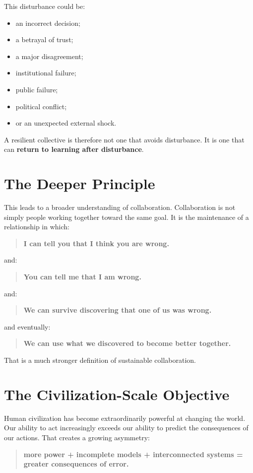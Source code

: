 \documentclass{article}
\begin{document}
This disturbance could be:
\begin{itemize}
    \item an incorrect decision;
    \item a betrayal of trust;
    \item a major disagreement;
    \item institutional failure;
    \item public failure;
    \item political conflict;
    \item or an unexpected external shock.
\end{itemize}

A resilient collective is therefore not one that avoids disturbance. It is one that can \textbf{return to learning after disturbance}.

\section{The Deeper Principle}
This leads to a broader understanding of collaboration. Collaboration is not simply people working together toward the same goal. It is the maintenance of a relationship in which:
\begin{quote}
    \textbf{I can tell you that I think you are wrong.}
\end{quote}
and:
\begin{quote}
    \textbf{You can tell me that I am wrong.}
\end{quote}
and:
\begin{quote}
    \textbf{We can survive discovering that one of us was wrong.}
\end{quote}
and eventually:
\begin{quote}
    \textbf{We can use what we discovered to become better together.}
\end{quote}

That is a much stronger definition of sustainable collaboration.

\section{The Civilization-Scale Objective}
Human civilization has become extraordinarily powerful at changing the world. Our ability to act increasingly exceeds our ability to predict the consequences of our actions. That creates a growing asymmetry:
\begin{quote}
    \textbf{more power + incomplete models + interconnected systems = greater consequences of error.}
\end{quote}
\end{document}
